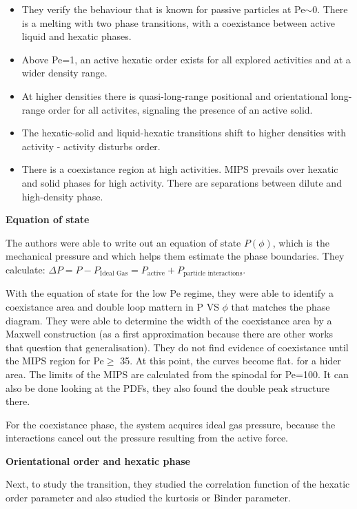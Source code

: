 \documentclass[a4paper]{article}
\begin{document}
\begin{itemize}
	\item They verify the behaviour that is known for passive particles at Pe$\sim 0$. There is a melting with two phase transitions, with a coexistance between active liquid and hexatic phases. 
	\item Above Pe=1, an active hexatic order exists for all explored activities and at a wider density range.
	\item At higher densities there is quasi-long-range positional and orientational long-range order for all activites, signaling the presence of an active solid.
	\item The hexatic-solid and liquid-hexatic transitions shift to higher densities with activity - activity disturbs order.
	\item There is a coexistance region at high activities. MIPS prevails over hexatic and solid phases for high activity. There are separations between dilute and high-density phase.
\end{itemize}

\textbf{Equation of state}

The authors were able to write out an equation of state $P(\phi)$, which is the mechanical pressure and which helps them estimate the phase boundaries. They calculate: $\Delta P = P - P_\text{Ideal Gas} = P_\text{active} + P_\text{particle interactions}$.

With the equation of state for the low Pe regime, they were able to identify a coexistance area and double loop mattern in P VS $\phi$ that matches the phase diagram. They were able to determine the width of the coexistance area by a Maxwell construction (as a first approximation because there are other works that question that generalisation). They do not find evidence of coexistance until the MIPS region for Pe$\geq$ 35. At this point, the curves become flat. for a hider area. The limits of the MIPS are calculated from the spinodal for Pe=100. It can also be done looking at the PDFs, they also found the double peak structure there.

For the coexistance phase, the system acquires ideal gas pressure, because the interactions cancel out the pressure resulting from the active force.

\textbf{Orientational order and hexatic phase}

Next, to study the transition, they studied the correlation function of the hexatic order parameter and also studied the kurtosis or Binder parameter.
\end{document}
